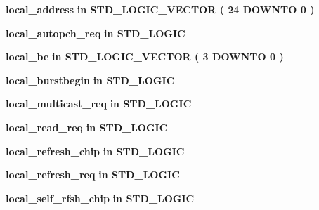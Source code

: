 \begin{DoxyCompactItemize}
\item 
{\bf local\+\_\+address}  {\bfseries {\bfseries \textcolor{keywordflow}{in}\textcolor{vhdlchar}{ }}} {\bfseries \textcolor{comment}{S\+T\+D\+\_\+\+L\+O\+G\+I\+C\+\_\+\+V\+E\+C\+T\+OR}\textcolor{vhdlchar}{ }\textcolor{vhdlchar}{(}\textcolor{vhdlchar}{ }\textcolor{vhdlchar}{ } \textcolor{vhdldigit}{24} \textcolor{vhdlchar}{ }\textcolor{keywordflow}{D\+O\+W\+N\+TO}\textcolor{vhdlchar}{ }\textcolor{vhdlchar}{ } \textcolor{vhdldigit}{0} \textcolor{vhdlchar}{ }\textcolor{vhdlchar}{)}\textcolor{vhdlchar}{ }} 
\item 
{\bf local\+\_\+autopch\+\_\+req}  {\bfseries {\bfseries \textcolor{keywordflow}{in}\textcolor{vhdlchar}{ }}} {\bfseries \textcolor{comment}{S\+T\+D\+\_\+\+L\+O\+G\+IC}\textcolor{vhdlchar}{ }} 
\item 
{\bf local\+\_\+be}  {\bfseries {\bfseries \textcolor{keywordflow}{in}\textcolor{vhdlchar}{ }}} {\bfseries \textcolor{comment}{S\+T\+D\+\_\+\+L\+O\+G\+I\+C\+\_\+\+V\+E\+C\+T\+OR}\textcolor{vhdlchar}{ }\textcolor{vhdlchar}{(}\textcolor{vhdlchar}{ }\textcolor{vhdlchar}{ } \textcolor{vhdldigit}{3} \textcolor{vhdlchar}{ }\textcolor{keywordflow}{D\+O\+W\+N\+TO}\textcolor{vhdlchar}{ }\textcolor{vhdlchar}{ } \textcolor{vhdldigit}{0} \textcolor{vhdlchar}{ }\textcolor{vhdlchar}{)}\textcolor{vhdlchar}{ }} 
\item 
{\bf local\+\_\+burstbegin}  {\bfseries {\bfseries \textcolor{keywordflow}{in}\textcolor{vhdlchar}{ }}} {\bfseries \textcolor{comment}{S\+T\+D\+\_\+\+L\+O\+G\+IC}\textcolor{vhdlchar}{ }} 
\item 
{\bf local\+\_\+multicast\+\_\+req}  {\bfseries {\bfseries \textcolor{keywordflow}{in}\textcolor{vhdlchar}{ }}} {\bfseries \textcolor{comment}{S\+T\+D\+\_\+\+L\+O\+G\+IC}\textcolor{vhdlchar}{ }} 
\item 
{\bf local\+\_\+read\+\_\+req}  {\bfseries {\bfseries \textcolor{keywordflow}{in}\textcolor{vhdlchar}{ }}} {\bfseries \textcolor{comment}{S\+T\+D\+\_\+\+L\+O\+G\+IC}\textcolor{vhdlchar}{ }} 
\item 
{\bf local\+\_\+refresh\+\_\+chip}  {\bfseries {\bfseries \textcolor{keywordflow}{in}\textcolor{vhdlchar}{ }}} {\bfseries \textcolor{comment}{S\+T\+D\+\_\+\+L\+O\+G\+IC}\textcolor{vhdlchar}{ }} 
\item 
{\bf local\+\_\+refresh\+\_\+req}  {\bfseries {\bfseries \textcolor{keywordflow}{in}\textcolor{vhdlchar}{ }}} {\bfseries \textcolor{comment}{S\+T\+D\+\_\+\+L\+O\+G\+IC}\textcolor{vhdlchar}{ }} 
\item 
{\bf local\+\_\+self\+\_\+rfsh\+\_\+chip}  {\bfseries {\bfseries \textcolor{keywordflow}{in}\textcolor{vhdlchar}{ }}} {\bfseries \textcolor{comment}{S\+T\+D\+\_\+\+L\+O\+G\+IC}\textcolor{vhdlchar}{ }} 

\end{DoxyCompactItemize}
